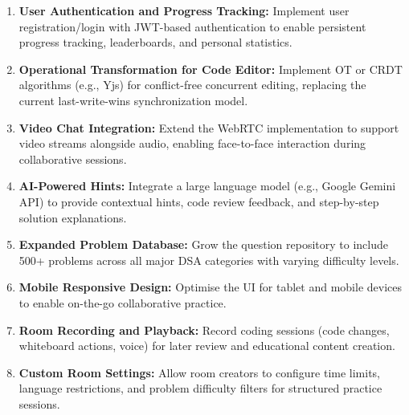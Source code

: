 \documentclass[12pt,a4paper,oneside]{report}
\begin{document}
\begin{enumerate}[label=\arabic*.]
    \item \textbf{User Authentication and Progress Tracking:} Implement user registration/login with JWT-based authentication to enable persistent progress tracking, leaderboards, and personal statistics.
    \item \textbf{Operational Transformation for Code Editor:} Implement OT or CRDT algorithms (e.g., Yjs) for conflict-free concurrent editing, replacing the current last-write-wins synchronization model.
    \item \textbf{Video Chat Integration:} Extend the WebRTC implementation to support video streams alongside audio, enabling face-to-face interaction during collaborative sessions.
    \item \textbf{AI-Powered Hints:} Integrate a large language model (e.g., Google Gemini API) to provide contextual hints, code review feedback, and step-by-step solution explanations.
    \item \textbf{Expanded Problem Database:} Grow the question repository to include 500+ problems across all major DSA categories with varying difficulty levels.
    \item \textbf{Mobile Responsive Design:} Optimise the UI for tablet and mobile devices to enable on-the-go collaborative practice.
    \item \textbf{Room Recording and Playback:} Record coding sessions (code changes, whiteboard actions, voice) for later review and educational content creation.
    \item \textbf{Custom Room Settings:} Allow room creators to configure time limits, language restrictions, and problem difficulty filters for structured practice sessions.
\end{enumerate}




\end{document}
